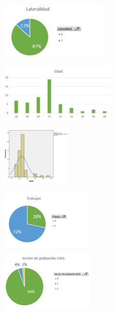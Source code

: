 \begin{center}
\includegraphics[height=1.15in]{figuras/Imagen12.png}
\end{center}

\begin{center}
\includegraphics[height=1.15in]{figuras/Imagen13.png}
\end{center}

\begin{center}
\includegraphics[height=1.15in]{figuras/Imagen14.png}
\end{center}

\begin{center}
\includegraphics[height=1.15in]{figuras/Imagen15.png}
\end{center}

\begin{center}
\includegraphics[height=1.15in]{figuras/Imagen16.png}
\end{center}

